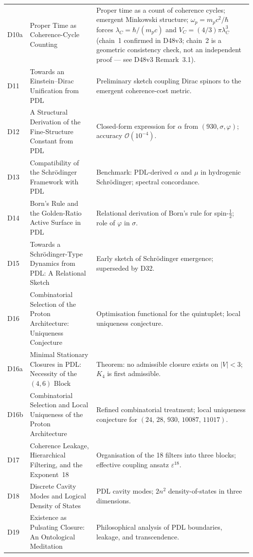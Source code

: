\documentclass[11pt,a4paper]{article}
\theoremstyle{plain}
\theoremstyle{definition}
\theoremstyle{remark}
\newcommand{\quintuplet}{(24,\,28,\,930,\,10087,\,11017)}
\begin{document}
\begin{longtable}{L{1.3cm}L{3.8cm}L{8.0cm}}
D10a & Proper Time as Coherence-Cycle Counting~\cite{D10a} & Proper time as a count of coherence cycles; emergent Minkowski structure; $\omega_p = m_p c^2/\hbar$ forces $\lambda_C = \hbar/(m_p c)$ and $V_C = (4/3)\pi\lambda_C^3$ (chain~1 confirmed in D48v3; chain~2 is a geometric consistency check, not an independent proof --- see D48v3 Remark~3.1).\\[0.3em]
D11 & Towards an Einstein--Dirac Unification from PDL~\cite{D11} & Preliminary sketch coupling Dirac spinors to the emergent coherence-cost metric.\\[0.3em]
D12 & A Structural Derivation of the Fine-Structure Constant from PDL~\cite{D12} & Closed-form expression for $\alpha$ from $(930, \sigma, \varphi)$; accuracy $\mathcal{O}(10^{-4})$.\\[0.3em]
D13 & Compatibility of the Schr\"odinger Framework with PDL~\cite{D13} & Benchmark: PDL-derived $\alpha$ and $\mu$ in hydrogenic Schr\"odinger; spectral concordance.\\[0.3em]
D14 & Born's Rule and the Golden-Ratio Active Surface in PDL~\cite{D14} & Relational derivation of Born's rule for spin-$\tfrac{1}{2}$; role of $\varphi$ in $\sigma$.\\[0.3em]
D15 & Towards a Schr\"odinger-Type Dynamics from PDL: A Relational Sketch~\cite{D15} & Early sketch of Schr\"odinger emergence; superseded by D32.\\[0.3em]
D16 & Combinatorial Selection of the Proton Architecture: Uniqueness Conjecture~\cite{D16} & Optimisation functional for the quintuplet; local uniqueness conjecture.\\[0.3em]
D16a & Minimal Stationary Closures in PDL: Necessity of the $(4,6)$ Block~\cite{D16a} & \textcolor{proofblue}{Theorem}: no admissible closure exists on $|V|<3$; $K_4$ is first admissible.\\[0.3em]
D16b & Combinatorial Selection and Local Uniqueness of the Proton Architecture~\cite{D16b} & Refined combinatorial treatment; local uniqueness conjecture for $\quintuplet$.\\[0.3em]
D17 & Coherence Leakage, Hierarchical Filtering, and the Exponent~18~\cite{D17} & Organisation of the 18 filters into three blocks; effective coupling ansatz $\varepsilon^{18}$.\\[0.3em]
D18 & Discrete Cavity Modes and Logical Density of States~\cite{D18} & PDL cavity modes; $2n^2$ density-of-states in three dimensions.\\[0.3em]
D19 & Existence as Pulsating Closure: An Ontological Meditation~\cite{D19} & Philosophical analysis of PDL boundaries, leakage, and transcendence.\\[0.3em]

\end{longtable}
\end{document}
